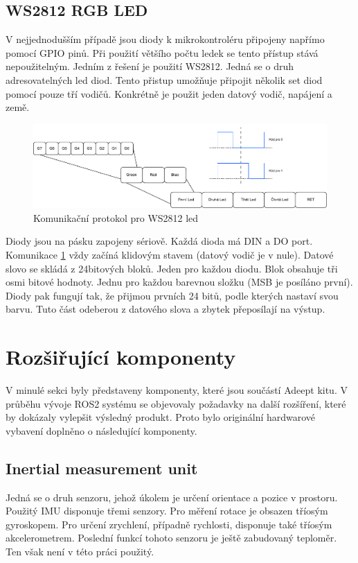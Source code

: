 \subsection*{WS2812 RGB LED}
V nejjednodušším případě jsou diody k mikrokontroléru připojeny napřímo pomocí GPIO pinů. Při použití většího počtu ledek se tento přístup stává nepoužitelným. Jedním z řešení je použití WS2812. Jedná se o druh adresovatelných led diod. Tento přistup umožňuje připojit několik set diod pomocí pouze tří vodičů. Konkrétně je použit jeden datový vodič, napájení a země.\cite[str:~2]{ws2812}

\begin{figure}[h!]
	\centering
	\includegraphics[scale=0.6]{obrazky-figures/ws2812_led.pdf}
	\caption{Komunikační protokol pro WS2812 led}
	\label{fig:ws2812_protocol}
\end{figure}

Diody jsou na pásku zapojeny sériově. Každá dioda má DIN a DO port. Komunikace \ref{fig:ws2812_protocol} vždy začíná klidovým stavem (datový vodič je v nule). Datové slovo se skládá z 24bitových bloků. Jeden pro každou diodu. Blok obsahuje tři osmi bitové hodnoty. Jednu pro každou barevnou složku (MSB je posíláno první). Diody pak fungují tak, že přijmou prvních 24 bitů, podle kterých nastaví svou barvu. Tuto část odeberou z datového slova a zbytek přeposílají na výstup. \cite[str:~4]{ws2812}

\section{Rozšiřující komponenty}
V minulé sekci byly představeny komponenty, které jsou součástí Adeept kitu. V průběhu vývoje ROS2 systému se objevovaly požadavky na další rozšíření, které by dokázaly vylepšit výsledný produkt. Proto bylo originální hardwarové vybavení doplněno o následující komponenty.

\subsection*{Inertial measurement unit}
Jedná se o druh senzoru, jehož úkolem je určení orientace a pozice v prostoru. Použitý IMU disponuje třemi senzory. Pro měření rotace je obsazen tříosým gyroskopem. Pro určení zrychlení, případně rychlosti, disponuje také tříosým akcelerometrem. Poslední funkcí tohoto senzoru je ještě zabudovaný teploměr. Ten však není v této práci použitý.

